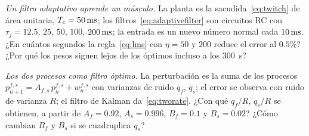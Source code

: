 \begin{exercise}[\lvlB]
\label{ex:15:6}
\emph{Un filtro adaptativo aprende un músculo.} La planta es la sacudida~\eqref{eq:twitch} de área unitaria, $T_c=50\,\text{ms}$; los filtros~\eqref{eq:adaptivefilter} son circuitos RC con $\tau_j=12.5$, $25$, $50$, $100$, $200\,\text{ms}$; la entrada es un nuevo número normal cada $10\,\text{ms}$. ¿En cuántos segundos la regla~\eqref{eq:lms} con $\eta=50$ y $200$ reduce el error al $0.5\%$? ¿Por qué los pesos siguen lejos de los óptimos incluso a los $300$~s?
\end{exercise}

\begin{exercise}[\lvlC]
\label{ex:15:7}
\emph{Los dos procesos como filtro óptimo.} La perturbación es la suma de los procesos $p^{f,s}_{n+1}=A_{f,s}\,p^{f,s}_n+w^{f,s}_n$ con varianzas de ruido $q_f$, $q_s$; el error se observa con ruido de varianza $R$; el filtro de Kalman da~\eqref{eq:tworate}. ¿Con qué $q_f/R$, $q_s/R$ se obtienen, a partir de $A_f=0.92$, $A_s=0.996$, $B_f=0.1$ y $B_s=0.02$? ¿Cómo cambian $B_f$ y $B_s$ si se cuadruplica $q_s$?
\end{exercise}
